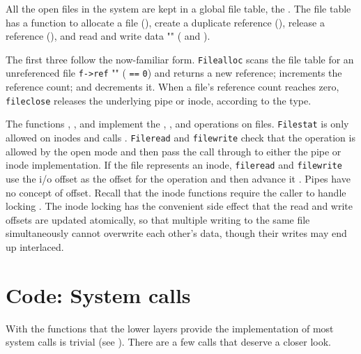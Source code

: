 All the open files in the system are kept in a global file table,
the 
.
The file table
has a function to allocate a file
(),
create a duplicate reference
(),
release a reference
(),
and read and write data
 "" (
and 
).

The first three follow the now-familiar form.
\lstinline{Filealloc}
scans the file table for an unreferenced file
\lstinline{f->ref} "" (
\lstinline{==}
\lstinline{0})
and returns a new reference;
increments the reference count;
and
decrements it.
When a file's reference count reaches zero,
\lstinline{fileclose}
releases the underlying pipe or inode,
according to the type.

The functions
,
,
and
implement the 
,
,
and
operations on files.
\lstinline{Filestat}
is only allowed on inodes and calls
.
\lstinline{Fileread}
and
\lstinline{filewrite}
check that the operation is allowed by
the open mode and then
pass the call through to either
the pipe or inode implementation.
If the file represents an inode,
\lstinline{fileread}
and
\lstinline{filewrite}
use the i/o offset as the offset for the operation
and then advance it
.
Pipes have no concept of offset.
Recall that the inode functions require the caller
to handle locking
.
The inode locking has the convenient side effect that the
read and write offsets are updated atomically, so that
multiple writing to the same file simultaneously
cannot overwrite each other's data, though their writes may end up interlaced.
\section{Code: System calls}

With the functions that the lower layers provide the implementation of most
system calls is trivial
(see
).
There are a few calls that
deserve a closer look.

